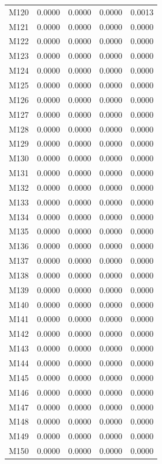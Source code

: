 \begin{longtable}{lrrrr}
M120 & 0.0000 & 0.0000 & 0.0000 & 0.0013 \\
M121 & 0.0000 & 0.0000 & 0.0000 & 0.0000 \\
M122 & 0.0000 & 0.0000 & 0.0000 & 0.0000 \\
M123 & 0.0000 & 0.0000 & 0.0000 & 0.0000 \\
M124 & 0.0000 & 0.0000 & 0.0000 & 0.0000 \\
M125 & 0.0000 & 0.0000 & 0.0000 & 0.0000 \\
M126 & 0.0000 & 0.0000 & 0.0000 & 0.0000 \\
M127 & 0.0000 & 0.0000 & 0.0000 & 0.0000 \\
M128 & 0.0000 & 0.0000 & 0.0000 & 0.0000 \\
M129 & 0.0000 & 0.0000 & 0.0000 & 0.0000 \\
M130 & 0.0000 & 0.0000 & 0.0000 & 0.0000 \\
M131 & 0.0000 & 0.0000 & 0.0000 & 0.0000 \\
M132 & 0.0000 & 0.0000 & 0.0000 & 0.0000 \\
M133 & 0.0000 & 0.0000 & 0.0000 & 0.0000 \\
M134 & 0.0000 & 0.0000 & 0.0000 & 0.0000 \\
M135 & 0.0000 & 0.0000 & 0.0000 & 0.0000 \\
M136 & 0.0000 & 0.0000 & 0.0000 & 0.0000 \\
M137 & 0.0000 & 0.0000 & 0.0000 & 0.0000 \\
M138 & 0.0000 & 0.0000 & 0.0000 & 0.0000 \\
M139 & 0.0000 & 0.0000 & 0.0000 & 0.0000 \\
M140 & 0.0000 & 0.0000 & 0.0000 & 0.0000 \\
M141 & 0.0000 & 0.0000 & 0.0000 & 0.0000 \\
M142 & 0.0000 & 0.0000 & 0.0000 & 0.0000 \\
M143 & 0.0000 & 0.0000 & 0.0000 & 0.0000 \\
M144 & 0.0000 & 0.0000 & 0.0000 & 0.0000 \\
M145 & 0.0000 & 0.0000 & 0.0000 & 0.0000 \\
M146 & 0.0000 & 0.0000 & 0.0000 & 0.0000 \\
M147 & 0.0000 & 0.0000 & 0.0000 & 0.0000 \\
M148 & 0.0000 & 0.0000 & 0.0000 & 0.0000 \\
M149 & 0.0000 & 0.0000 & 0.0000 & 0.0000 \\
M150 & 0.0000 & 0.0000 & 0.0000 & 0.0000 \\

\end{longtable}
